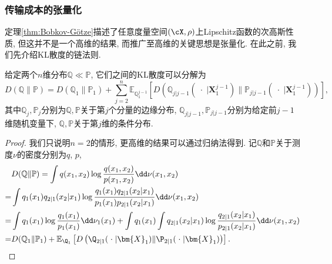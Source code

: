 \subsubsection{传输成本的张量化}
定理\ref{thm:Bobkov-Götze}描述了任意度量空间$(\cX, \rho)$上Lipschitz函数的次高斯性质, 但这并不是一个高维的结果, 而推广至高维的关键思想是张量化. 
在此之前, 我们先介绍KL散度的链法则. 
\begin{lemma}\label{lemma:ChainRuleForKLDivergence}
	给定两个$n$维分布$\mathbb{Q} \ll \mathbb{P}$, 它们之间的KL散度可以分解为
	\begin{equation*}
		D(\mathbb{Q} \| \mathbb{P})
		= D(\mathbb{Q}_1 \| \mathbb{P}_1) + \sum_{j=2}^n \mathbb{E}_{\mathbb{Q}_1^{j-1}} \left[ D\left(\mathbb{Q}_{j | j-1}(\;\cdot\; | \bm{X}_1^{j-1}) \big\| \mathbb{P}_{j | j-1}(\;\cdot\; | \bm{X}_1^{j-1})\right) \right], 
	\end{equation*}
	其中$\mathbb{Q}_j, \mathbb{P}_j$分别为$\mathbb{Q}, \mathbb{P}$关于第$j$个分量的边缘分布, $\mathbb{Q}_{j | j-1}, \mathbb{P}_{j | j-1}$分别为给定前$j-1$维随机变量下, $\mathbb{Q}, \mathbb{P}$关于第$j$维的条件分布. 
\end{lemma}
\begin{proof}
	我们只说明$n = 2$的情形, 更高维的结果可以通过归纳法得到. 
	记$\mathbb{Q}$和$\mathbb{P}$关于测度$\nu$的密度分别为$q$, $p$, 
	\begin{align*}
		& D(\mathbb{Q} \| \mathbb{P})
		= \int q(x_1, x_2) \log \frac{q(x_1, x_2)}{p(x_1, x_2)} \dd \nu(x_1, x_2) \\
		=& \int q_1(x_1) q_{2|1}(x_2|x_1) \log \frac{q_1(x_1) q_{2|1}(x_2|x_1)}{p_1(x_1) p_{2|1}(x_2|x_1)} \dd \nu(x_1, x_2) \\
		=& \int q_1(x_1) \log \frac{q_1(x_1)}{p_1(x_1)} \dd \nu_1(x_1) + \int q_1(x_1) \int q_{2|1}(x_2|x_1) \log \frac{q_{2|1}(x_2|x_1)}{p_{2|1}(x_2|x_1)} \dd \nu(x_1, x_2) \\
		=& D(\mathbb{Q}_1 \| \mathbb{P}_1) + \mathbb{E}_{\Q_1} \left[ D\left(\Q_{2|1}(\;\cdot\; | \bm{X}_1) \| \P_{2|1}(\;\cdot\; | \bm{X}_1)\right) \right]. 
	\end{align*}
\end{proof}

